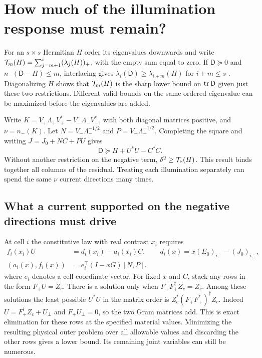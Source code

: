 \section{How much of the illumination response must remain?}\label{sec:bound}

For an $s\times s$ Hermitian $H$ order its eigenvalues downwards and write
$\mathcal T_m(H)=\sum_{j=m+1}^{s}(\lambda_j(H))_+$, with the empty sum equal to zero. If $\mathsf D\succeq0$ and $n_-(\mathsf D-H)\le m$, interlacing gives
$\lambda_i(\mathsf D)\ge\lambda_{i+m}(H)$ for $i+m\le s$ \cite{fan,tian}. Diagonalizing $H$ shows that $\mathcal T_m(H)$ is the sharp lower bound on $\operatorname{tr}\mathsf D$ given just these two restrictions. Different valid bounds on the same ordered eigenvalue can be maximized before the eigenvalues are added.

Write $K=V_+\Lambda_+ V_+^*-V_-\Lambda_- V_-^*$, with both diagonal matrices positive, and $\nu=n_-(K)$. Let $N=V_-\Lambda_-^{-1/2}$ and $P=V_+\Lambda_+^{-1/2}$. Completing the square and writing $J=J_0+NC+PU$ gives
\begin{equation}
 \mathsf D\succeq H+U^*U-C^*C . \label{eq:started}
\end{equation}
Without another restriction on the negative term, $\delta^2\ge\mathcal T_{\nu}(H)$. This result binds together all columns of the residual. Treating each illumination separately can spend the same $\nu$ current directions many times.

\subsection{What a current supported on the negative directions must drive}

At cell $i$ the constitutive law with real contrast $x_i$ requires
\begin{align}
 f_i(x_i)U&=d_i(x_i)-a_i(x_i)C,\qquad d_i(x)=x(E_0)_{i,:}-(J_0)_{i,:},\nonumber\\
 (a_i(x),f_i(x))&=e_i^\top(I-xG)[N,P]. \label{eq:rows}
\end{align}
where $e_i$ denotes a cell coordinate vector. For fixed $x$ and $C$, stack any rows in the form $F_+U=Z_c$. There is a solution only when $F_+F_+^\dagger Z_c=Z_c$. Among these solutions the least possible $U^*U$ in the matrix order is $Z_c^*(F_+F_+^*)^\dagger Z_c$. Indeed $U=F_+^\dagger Z_c+U_\perp$ and $F_+U_\perp=0$, so the two Gram matrices add. This is exact elimination for these rows at the specified material values. Minimizing the resulting physical outer problem over all allowable values and discarding the other rows gives a lower bound. Its remaining joint variables can still be numerous.

